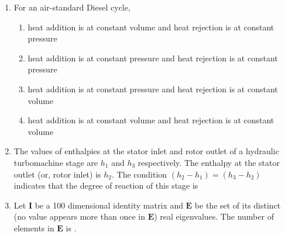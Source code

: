 \documentclass[12pt,onecolumn]{article}
\begin{document}
\begin{enumerate}
    \item For an air-standard Diesel cycle,
          \begin{enumerate}
              \item heat addition is at constant volume and heat rejection is at constant pressure
              \item heat addition is at constant pressure and heat rejection is at constant pressure
              \item heat addition is at constant pressure and heat rejection is at constant volume
              \item heat addition is at constant volume and heat rejection is at constant volume
          \end{enumerate}

    \item The values of enthalpies at the stator inlet and rotor outlet of a hydraulic turbomachine stage are $h_1$ and $h_3$ respectively. The enthalpy at the stator outlet (or, rotor inlet) is $h_2$. The condition $(h_2 - h_1) = (h_3 - h_2)$ indicates that the degree of reaction of this stage is
          \begin{enumerate}
          \end{enumerate}

    \item Let $\mathbf{I}$ be a 100 dimensional identity matrix and $\mathbf{E}$ be the set of its distinct (no value appears more than once in $\mathbf{E}$) real eigenvalues. The number of elements in $\mathbf{E}$ is \underline{\hspace{2cm}}.


\end{enumerate}
\end{document}
